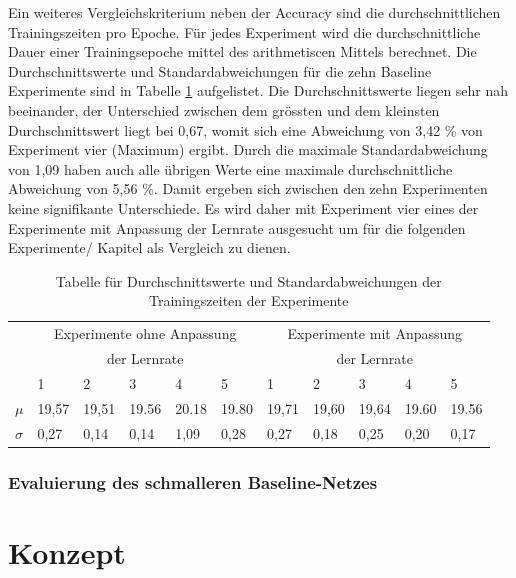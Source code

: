 Ein weiteres Vergleichskriterium neben der Accuracy sind die durchschnittlichen Trainingszeiten pro Epoche. Für jedes Experiment wird die durchschnittliche Dauer einer Trainingsepoche mittel des arithmetiscen Mittels berechnet.
Die Durchschnittswerte und Standardabweichungen für die zehn Baseline Experimente sind in Tabelle \ref{tab:baseline} aufgelistet. Die Durchschnittswerte liegen sehr nah beeinander, der Unterschied zwischen dem grössten und dem kleinsten Durchschnittswert liegt bei 0,67, womit sich eine Abweichung von 3,42 \% von Experiment vier (Maximum) ergibt. Durch die maximale Standardabweichung von 1,09 haben auch alle übrigen Werte eine maximale durchschnittliche Abweichung von 5,56 \%. Damit ergeben sich zwischen den zehn Experimenten keine signifikante Unterschiede. Es wird daher mit Experiment vier eines der Experimente mit Anpassung der Lernrate ausgesucht um für die folgenden Experimente/ Kapitel als Vergleich zu dienen.
\begin{table}[h]
\begin{tabular}{|l|l|l|l|l|l|l|l|l|l|l|} \hline
           & \multicolumn{5}{c|}{Experimente ohne Anpassung}&\multicolumn{5}{c|}{Experimente mit Anpassung} \\
           &\multicolumn{5}{c|}{der Lernrate} &\multicolumn{5}{c|}{der Lernrate}\\
           & 1       & 2      & 3      & 4       & 5       & 1      & 2     & 3      & 4     & 5  \\ \hline 
$\mu$      & 19,57   & 19,51  & 19.56  & 20.18   & 19.80   & 19,71  & 19,60 & 19,64  & 19.60 & 19.56 \\ \hline
$\sigma$   & 0,27    & 0,14   & 0,14   & 1,09    & 0,28    & 0,27   & 0,18  & 0,25   & 0,20  & 0,17   \\ \hline
\end{tabular}
\caption{Tabelle für Durchschnittswerte und Standardabweichungen der Trainingszeiten der Experimente}
\label{tab:baseline}
\end{table}

\subsubsection{Evaluierung des schmalleren Baseline-Netzes}


\section{Konzept}\label{sec:konzept}


\color{black}


